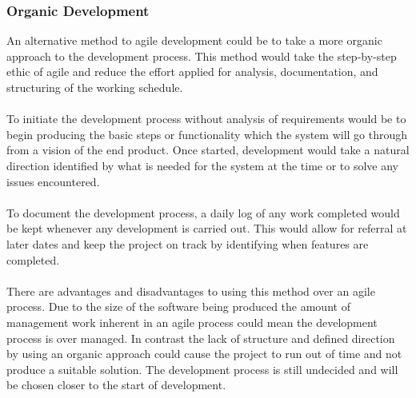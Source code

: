 		\subsubsection{Organic Development}
			An alternative method to agile development could be to take a more organic approach to the development process. This method would take the step-by-step ethic of agile and reduce the effort applied for analysis, documentation, and structuring of the working schedule.
			\\\\
			To initiate the development process without analysis of requirements would be to begin producing the basic steps or functionality which the system will go through from a vision of the end product. Once started, development would take a natural direction identified by what is needed for the system at the time or to solve any issues encountered.
			\\\\
			To document the development process, a daily log of any work completed would be kept whenever any development is carried out. This would allow for referral at later dates and keep the project on track by identifying when features are completed.
			\\\\
			There are advantages and disadvantages to using this method over an agile process. Due to the size of the software being produced the amount of management work inherent in an agile process could mean the development process is over managed. In contrast the lack of structure and defined direction by using an organic approach could cause the project to run out of time and not produce a suitable solution. The development process is still undecided and will be chosen closer to the start of development.
